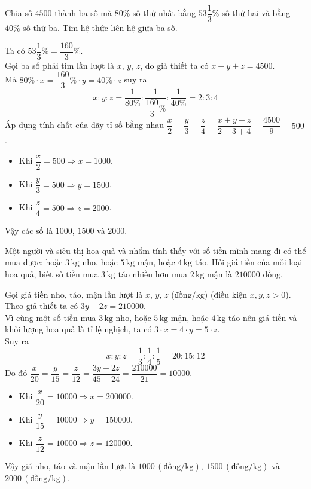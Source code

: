 \begin{vd}%
	Chia số $4500$ thành ba số mà $80\%$ số thứ nhất bằng $53\dfrac{1}{3}\%$ số thứ hai và bằng $40\%$ số thứ ba. Tìm hệ thức liên hệ giữa ba số.
	\loigiai
	{Ta có $53\dfrac{1}{3}\% =\dfrac{160}{3}\%$.\\
		Gọi ba số phải tìm lần lượt là $x$, $y$, $z$, do giả thiết ta có $x + y + z = 4500$.\\
		Mà  $80\%\cdot x = \dfrac{160}{3}\%\cdot y = 40\%\cdot z$ suy ra
		$$x\colon y\colon z = \dfrac{1}{80\%}\colon\dfrac{1}{\dfrac{160}{3}\%}\colon\dfrac{1}{40\%} = 2\colon 3\colon 4$$ 
		Áp dụng tính chất của dãy tỉ số bằng nhau $\dfrac{x}{2} = \dfrac{y}{3}= \dfrac{z}{4} = \dfrac{x + y + z}{2 + 3 + 4} = \dfrac{4500}{9} = 500$.\\
		\begin{itemize}
			\item Khi $\dfrac{x}{2}= 500\Rightarrow x = 1000$.
			\item Khi $\dfrac{y}{3} = 500\Rightarrow y = 1500$.
			\item  Khi $\dfrac{z}{4} = 500\Rightarrow z = 2000$.
		\end{itemize}
	Vậy các số là $1000$, $1500$ và $2000$.
			}
\end{vd}

\begin{vd}%
Một người và siêu thị hoa quả và nhẩm tính thấy với số tiền mình mang đi có thể mua được: hoặc $3\, \mathrm{kg}$ nho, hoặc $5\, \mathrm{kg}$ mận, hoặc $4\, \mathrm{kg}$ táo. Hỏi giá tiền của mỗi loại hoa quả, biết số tiền mua  $3\, \mathrm{kg}$ táo nhiều hơn mua  $2\, \mathrm{kg}$ mận là $210000$ đồng. 
\loigiai
	{Gọi giá tiền nho, táo, mận lần lượt là $x$, $y$, $z$ ($\mathrm{\text{đồng}}/\mathrm{kg}$) (điều kiện $x, y, z > 0$).\\
 Theo giả thiết ta có $3y - 2z = 210000$.\\
Vì cùng một số tiền mua $3\, \mathrm{kg}$ nho, hoặc $5\, \mathrm{kg}$ mận, hoặc $4\, \mathrm{kg}$ táo nên giá tiền và khối lượng hoa quả là tỉ lệ nghịch, ta có  $3\cdot x = 4\cdot y = 5\cdot z$.\\
 Suy ra
		$$x\colon y\colon z = \dfrac{1}{3}\colon\dfrac{1}{4}\colon\dfrac{1}{5} = 20\colon 15\colon 12$$ 
		Do đó $\dfrac{x}{20} = \dfrac{y}{15}= \dfrac{z}{12} = \dfrac{3y - 2z}{45 - 24} = \dfrac{210000}{21} = 10000$.\\
		\begin{itemize}
			\item Khi $\dfrac{x}{20}= 10000\Rightarrow x = 200000$.
			\item Khi $\dfrac{y}{15} = 10000\Rightarrow y = 150000$.
			\item  Khi $\dfrac{z}{12} = 10000\Rightarrow z = 120000$.
		\end{itemize}
		Vậy giá nho, táo và mận lần lượt là $1000\, (\mathrm{\text{đồng}}/\mathrm{kg})$, $1500\, (\mathrm{\text{đồng}}/\mathrm{kg})$ và $2000\, (\mathrm{\text{đồng}}/\mathrm{kg})$.
	}
\end{vd}


